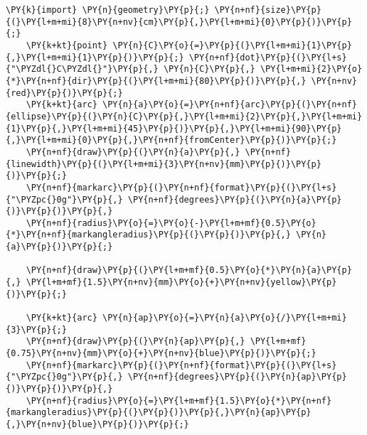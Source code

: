 \begin{Verbatim}[commandchars=\\\{\}]
    \PY{k}{import} \PY{n}{geometry}\PY{p}{;} \PY{n+nf}{size}\PY{p}{(}\PY{l+m+mi}{8}\PY{n+nv}{cm}\PY{p}{,}\PY{l+m+mi}{0}\PY{p}{)}\PY{p}{;}
    \PY{k+kt}{point} \PY{n}{C}\PY{o}{=}\PY{p}{(}\PY{l+m+mi}{1}\PY{p}{,}\PY{l+m+mi}{1}\PY{p}{)}\PY{p}{;} \PY{n+nf}{dot}\PY{p}{(}\PY{l+s}{"\PYZdl{}C\PYZdl{}"}\PY{p}{,} \PY{n}{C}\PY{p}{,} \PY{l+m+mi}{2}\PY{o}{*}\PY{n+nf}{dir}\PY{p}{(}\PY{l+m+mi}{80}\PY{p}{)}\PY{p}{,} \PY{n+nv}{red}\PY{p}{)}\PY{p}{;}
    \PY{k+kt}{arc} \PY{n}{a}\PY{o}{=}\PY{n+nf}{arc}\PY{p}{(}\PY{n+nf}{ellipse}\PY{p}{(}\PY{n}{C}\PY{p}{,}\PY{l+m+mi}{2}\PY{p}{,}\PY{l+m+mi}{1}\PY{p}{,}\PY{l+m+mi}{45}\PY{p}{)}\PY{p}{,}\PY{l+m+mi}{90}\PY{p}{,}\PY{l+m+mi}{0}\PY{p}{,}\PY{n+nf}{fromCenter}\PY{p}{)}\PY{p}{;}
    \PY{n+nf}{draw}\PY{p}{(}\PY{n}{a}\PY{p}{,} \PY{n+nf}{linewidth}\PY{p}{(}\PY{l+m+mi}{3}\PY{n+nv}{mm}\PY{p}{)}\PY{p}{)}\PY{p}{;}
    \PY{n+nf}{markarc}\PY{p}{(}\PY{n+nf}{format}\PY{p}{(}\PY{l+s}{"\PYZpc{}0g"}\PY{p}{,} \PY{n+nf}{degrees}\PY{p}{(}\PY{n}{a}\PY{p}{)}\PY{p}{)}\PY{p}{,}
    \PY{n+nf}{radius}\PY{o}{=}\PY{o}{-}\PY{l+m+mf}{0.5}\PY{o}{*}\PY{n+nf}{markangleradius}\PY{p}{(}\PY{p}{)}\PY{p}{,} \PY{n}{a}\PY{p}{)}\PY{p}{;}

    \PY{n+nf}{draw}\PY{p}{(}\PY{l+m+mf}{0.5}\PY{o}{*}\PY{n}{a}\PY{p}{,} \PY{l+m+mf}{1.5}\PY{n+nv}{mm}\PY{o}{+}\PY{n+nv}{yellow}\PY{p}{)}\PY{p}{;}

    \PY{k+kt}{arc} \PY{n}{ap}\PY{o}{=}\PY{n}{a}\PY{o}{/}\PY{l+m+mi}{3}\PY{p}{;}
    \PY{n+nf}{draw}\PY{p}{(}\PY{n}{ap}\PY{p}{,} \PY{l+m+mf}{0.75}\PY{n+nv}{mm}\PY{o}{+}\PY{n+nv}{blue}\PY{p}{)}\PY{p}{;}
    \PY{n+nf}{markarc}\PY{p}{(}\PY{n+nf}{format}\PY{p}{(}\PY{l+s}{"\PYZpc{}0g"}\PY{p}{,} \PY{n+nf}{degrees}\PY{p}{(}\PY{n}{ap}\PY{p}{)}\PY{p}{)}\PY{p}{,}
    \PY{n+nf}{radius}\PY{o}{=}\PY{l+m+mf}{1.5}\PY{o}{*}\PY{n+nf}{markangleradius}\PY{p}{(}\PY{p}{)}\PY{p}{,}\PY{n}{ap}\PY{p}{,}\PY{n+nv}{blue}\PY{p}{)}\PY{p}{;}
\end{Verbatim}

